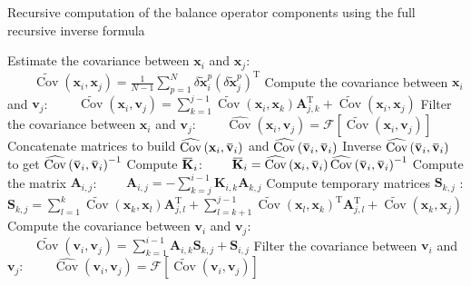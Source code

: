 \documentclass[12pt]{scrartcl}
\newcommand{\overbar}[1]{\mkern 1.5mu\overline{\mkern-1.5mu#1\mkern-1.5mu}\mkern 1.5mu}
\DeclareMathOperator{\Cov}{Cov}
\begin{document}
\begin{algorithm}[!ht]
\caption{Recursive computation of the balance operator components using the full recursive inverse formula \label{algo:full}}
\begin{algorithmic}
\STATE Estimate the covariance between $\mathbf{x}_i$ and $\mathbf{x}_j$:
\STATE $\displaystyle \qquad \widetilde{\Cov}\left(\mathbf{x}_i, \mathbf{x}_j\right) = \frac{1}{N-1} \sum_{p=1}^N \delta \widetilde{\mathbf{x}}^p_i \left(\delta \widetilde{\mathbf{x}}^p_j\right)^\mathrm{T}$
\ENDFOR
\ENDFOR
{}
\STATE Compute the covariance between $\mathbf{x}_i$ and $\mathbf{v}_j$:
\STATE $\displaystyle \qquad \widetilde{\Cov}\left(\mathbf{x}_i, \mathbf{v}_j\right) = \sum_{k=1}^{j-1} \widetilde{\Cov} \left(\mathbf{x}_i, \mathbf{x}_k\right) \mathbf{A}_{j,k}^\mathrm{T} + \widetilde{\Cov} \left(\mathbf{x}_i, \mathbf{x}_j\right)$
\STATE Filter the covariance between $\mathbf{x}_i$ and $\mathbf{v}_j$:
\STATE $\displaystyle \qquad \widehat{\Cov}\left(\mathbf{x}_i, \mathbf{v}_j\right) = \mathcal{F} \left[\widetilde{\Cov}\left(\mathbf{x}_i, \mathbf{v}_j\right)\right]$
\ENDFOR
\STATE Concatenate matrices to build $\widehat{\Cov}\left(\mathbf{x}_i, \overbar{\mathbf{v}}_i\right)$ and $\widehat{\Cov}\left(\overbar{\mathbf{v}}_i, \overbar{\mathbf{v}}_i\right)$
\STATE Inverse $\widehat{\Cov}\left(\overbar{\mathbf{v}}_i, \overbar{\mathbf{v}}_i\right)$ to get $\widehat{\Cov}\left(\overbar{\mathbf{v}}_i, \overbar{\mathbf{v}}_i\right)^{-1}$
\STATE Compute $\overbar{\mathbf{K}}_i$:
\STATE $\displaystyle \qquad \overbar{\mathbf{K}}_i = \widehat{\Cov}\left(\mathbf{x}_i, \overbar{\mathbf{v}}_i\right) \widehat{\Cov}\left(\overbar{\mathbf{v}}_i, \overbar{\mathbf{v}}_i\right)^{-1}$
\STATE Compute the matrix $\mathbf{A}_{i,j}$:
\STATE $\displaystyle \qquad \mathbf{A}_{i,j} = - \sum_{k=j}^{i-1} \mathbf{K}_{i,k} \mathbf{A}_{k,j}$
\ENDFOR
{}
\STATE Compute temporary matrices $\mathbf{S}_{k,j}$ :
\STATE $\displaystyle \mathbf{S}_{k,j} = \sum_{l=1}^{k} 
 \widetilde{\Cov}\left(\mathbf{x}_k, \mathbf{x}_l\right) \mathbf{A}_{j,l}^\mathrm{T} + \sum_{l=k+1}^{j-1} 
 \widetilde{\Cov}\left(\mathbf{x}_l, \mathbf{x}_k\right)^\mathrm{T} \mathbf{A}_{j,l}^\mathrm{T} + \widetilde{\Cov}\left(\mathbf{x}_k, \mathbf{x}_j\right)$
\ENDFOR
\STATE Compute the covariance between $\mathbf{v}_i$ and $\mathbf{v}_j$:
\STATE $\displaystyle \qquad \widetilde{\Cov}\left(\mathbf{v}_i, \mathbf{v}_j\right) = \sum_{k=1}^{i-1} \mathbf{A}_{i,k} \mathbf{S}_{k,j} + \mathbf{S}_{i,j}$
\STATE Filter the covariance between $\mathbf{v}_i$ and $\mathbf{v}_j$:
\STATE $\displaystyle \qquad \widehat{\Cov}\left(\mathbf{v}_i, \mathbf{v}_j\right) = \mathcal{F} \left[\widetilde{\Cov}\left(\mathbf{v}_i, \mathbf{v}_j\right)\right]$
\ENDFOR
\ENDIF
\ENDFOR
\end{algorithmic}
\end{algorithm}
\end{document}
